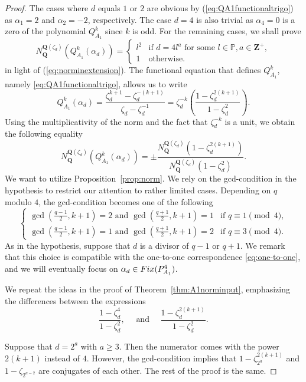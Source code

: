 \documentclass[10pt,a4paper]{amsart}
\newcommand{\Fix}{\textnormal{Fix}}
\newcommand{\Q}{\mathbf Q}
\newcommand{\Z}{\mathbf Z}
\newcommand{\cycl}[1]{\Q(\zeta_{#1})}
\begin{document}
\begin{proof}
The cases where $d$ equals $1$ or $2$ are obvious by (\ref{eq:QA1functionaltrigo}) as $\alpha_1=2$ and $\alpha_2=-2$, respectively. The case $d=4$ is also trivial as $\alpha_4=0$ is a zero of the polynomial $Q_{A_1}^k$ since $k$ is odd. For the remaining cases, we shall prove 
$$
N_{\Q}^{\Q(\zeta_d)}\left(Q_{A_1}^k(\alpha_d)\right) = 
\begin{cases}
	l^2 & \text{if } d = 4l^a\text{ for some }l\in\mathbb{P}, a\in\Z^{+},\\
	1 & \text{otherwise}.
\end{cases}
$$
in light of (\ref{eq:norminextension}). The functional equation that defines $Q_{A_1}^k$, namely \eqref{eq:QA1functionaltrigo}, allows us to write 
$$Q_{A_1}^k(\alpha_d)=\dfrac{\zeta_d^{k+1}-\zeta_d^{-(k+1)}}{\zeta_d-\zeta_d^{-1}}=\zeta_d^{-k}\left(\dfrac{1-\zeta_d^{2(k+1)}}{1-\zeta_d^2}\right).
$$
Using the multiplicativity of the norm and the fact that $\zeta_d^{-k}$ is a unit, we obtain the following equality
$$N_{\Q}^{\cycl{d}}(Q_{A_1}^k(\alpha_d))=\pm \frac{N_{\Q}^{\cycl{d}}\left(1-\zeta_d^{2(k+1)}\right)}{N_{\Q}^{\cycl{d}}\left(1-\zeta_d^2\right)}.
$$
We want to utilize Proposition~\ref{prop:norm}. We rely on the gcd-condition in the hypothesis to restrict our attention to rather limited cases. Depending on $q$ modulo $4$, the gcd-condition becomes one of the following
	$$
	\begin{cases}
		\gcd\left(\frac{q-1}{2}, k+1\right) = 2 \text{ and } \gcd\left(\frac{q+1}{2}, k+1\right) = 1 &\text{if } q\equiv1\pmod4,\\
		\gcd\left(\frac{q-1}{2}, k+1\right) = 1 \text{ and } \gcd\left(\frac{q+1}{2}, k+1\right) = 2 &\text{if } q\equiv3\pmod4.
	\end{cases}
	$$
As in the hypothesis, suppose that $d$ is a divisor of $q-1$ or $q+1$. We remark that this choice is compatible with the one-to-one correspondence \eqref{eq:one-to-one}, and we will eventually focus on $\alpha_d\in \Fix(P_{A_1}^q)$. 

We repeat the ideas in the proof of Theorem~\ref{thm:A1norminput}, emphasizing the differences between the expressions
\[ \frac{1-\zeta_d^4}{1-\zeta_d^2}, \quad \text{ and } \quad \dfrac{1-\zeta_d^{2(k+1)}}{1-\zeta_d^2}. \]

Suppose that $d=2^a$ with $a\ge 3$. Then the numerator comes with the power $2(k+1)$ instead of $4$. However, the gcd-condition implies that $1-\zeta_{2^a}^{2(k+1)}$ and  $1-\zeta_{2^{a-2}}$ are conjugates of each other. The rest of the proof is the same.  


\end{proof}
\end{document}
